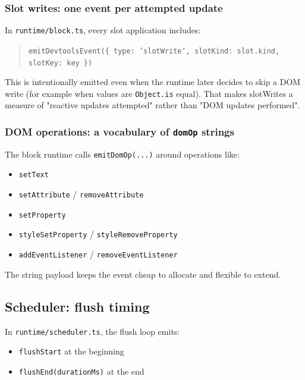 \subsubsection{Slot writes: one event per attempted update}

In \texttt{runtime/block.ts}, every slot application includes:

\begin{quote}
	\texttt{emitDevtoolsEvent(\{ type: 'slotWrite', slotKind: slot.kind, slotKey: key \})}
\end{quote}

This is intentionally emitted even when the runtime later decides to skip a DOM write (for example when values are \texttt{Object.is} equal). That makes slotWrites a measure of "reactive updates attempted" rather than "DOM updates performed".

\subsubsection{DOM operations: a vocabulary of \texttt{domOp} strings}

The block runtime calls \texttt{emitDomOp(...)} around operations like:

\begin{itemize}
\item \texttt{setText}
\item \texttt{setAttribute} / \texttt{removeAttribute}
\item \texttt{setProperty}
\item \texttt{styleSetProperty} / \texttt{styleRemoveProperty}
\item \texttt{addEventListener} / \texttt{removeEventListener}
\end{itemize}

The string payload keeps the event cheap to allocate and flexible to extend.

\subsection{Scheduler: flush timing}

In \texttt{runtime/scheduler.ts}, the flush loop emits:

\begin{itemize}
\item \texttt{flushStart} at the beginning
\item \texttt{flushEnd(durationMs)} at the end
\end{itemize}

